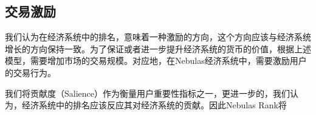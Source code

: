 \begin{comment}
当达到市场均衡时，星云币的价格满足供给量与需求量相等。此时的经济系统满足如下特性：

1. 根据市场结清理论（market clearing），$e_t$是当需求小于供给时的最低汇率:

\begin{align}
\label{etfunc}
e_t=min\{e:Q_t(e;x_t)\leq\bar{B} e \}
\end{align}

2. 根据理性预期理论(rational expectations),在时刻$t$，参与者会充分利用所得信息来预期下一阶段的汇率分布$G_{t+1}$，并且该预期可被认为是合理正确的,这里用$\mu_{it}$表示用户$i$的理性预期。
\begin{align}
\label{me_func}
\mu_{it}=G_{t+1}
\end{align}



定理: 存在且唯一的汇率$e^{*}(x_t)$使得供需达到平衡.


证明：

首先在某个时刻$t>\hat{t}$,假设存在所有用户都选择使用星云币发起交易，我们可以找到满足此情况的一个充分必要条件：
\begin{align}
\mathbb{E}v(\frac{\widetilde{Z}}{N})-c^+>u(\widehat{T};1)
\end{align}

其中$\widetilde{Z}$是服从二项分布$Bi(N,p)$的随机变量。



汇率$e_t$则会趋近于：

\begin{align}
e_t=\sum_i x_{i,t} / \bar{B}
\end{align}

此时收益函数可以表示为：
\begin{align}
u(T;1,e,\kappa_t,c_i)=\kappa_t \cdot \mathbb{E}_{it}v(\frac{\widetilde{e}_{t+1}}{e})-c_i\geq \kappa_t \mathbb{E}_{it}v(\frac{\widetilde{e}_{t+1}}{N/\bar{B}})-c^+
\approx \kappa_t \mathbb{E}v(\frac{\widetilde{Z}}{N})-c^+>u(\widehat{T};1)
\end{align}

即此时对于所有参与者，使用星云币交易为最优选择。

根据上文，$G_{t+1}$表示$\widetilde{e}_{t+1}$的分布，在$\hat{t}$时刻，所有用户参与并使用星云币进行交易，因此$\widetilde{e}_{\hat{t}+1}$已知并且近似于$\widetilde{Z}/\bar{B}$的分布，即已知$G_{t+1}$，同理可以推出已知$G_t$。基于理性预期，市场需求可以根据公式\eqref{demandfunc}对每个用户累加求和得出。公式\eqref{demandfunc}为连续函数，且当$e$从0逐渐增大时，$Q_t(e;x_t)$从$\sum_ix_{it}$减少到趋近于0.这意味着，一定存在某个$e_t$满足公式\eqref{etfunc},即存在汇率$e_t$满足供需平衡。
$\square$


\end{comment}



\subsection{交易激励}

我们认为在经济系统中的排名，意味着一种激励的方向，这个方向应该与经济系统增长的方向保持一致。为了保证或者进一步提升经济系统的货币的价值，根据上述模型，需要增加市场的交易规模。对应地，在Nebulas经济系统中，需要激励用户的交易行为。

我们将贡献度（Salience）作为衡量用户重要性指标之一，更进一步的，我们认为，经济系统中的排名应该反应其对经济系统的贡献。因此Nebulas Rank将

